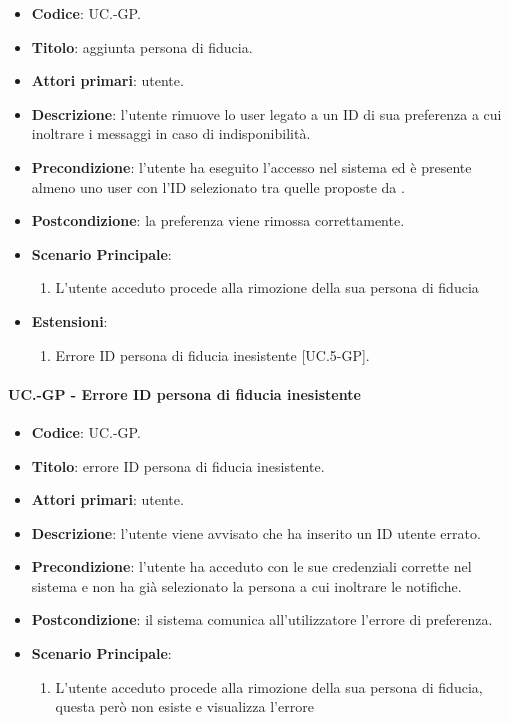 	\begin{itemize}
		\item \textbf{Codice}: UC\theuccount.\thesubuccount-GP.
		\item \textbf{Titolo}: aggiunta persona di fiducia.
		\item \textbf{Attori primari}: utente.
		\item \textbf{Descrizione}:  l’utente rimuove lo user legato a un ID di sua preferenza a cui inoltrare i messaggi in caso di indisponibilità.
		\item \textbf{Precondizione}: l’utente ha eseguito l'accesso nel sistema ed è presente almeno uno user con l'ID selezionato tra quelle proposte da \progetto.
		\item \textbf{Postcondizione}: la preferenza viene rimossa correttamente.
		\item \textbf{Scenario Principale}:
		\begin{enumerate}
			\item L'utente acceduto procede alla rimozione della sua persona di fiducia
		\end{enumerate}
		\item \textbf{Estensioni}:
		\begin{enumerate}
			\item Errore ID persona di fiducia inesistente [UC\theuccount.5-GP].
		\end{enumerate}
	\end{itemize}
	
	\paragraph{UC\theuccount.\thesubuccount-GP - Errore ID persona di fiducia inesistente}
	
	\begin{itemize}
		\item \textbf{Codice}: UC\theuccount.\thesubuccount-GP.
		\item \textbf{Titolo}: errore ID persona di fiducia inesistente.
		\item \textbf{Attori primari}: utente.
		\item \textbf{Descrizione}: l’utente viene avvisato che ha inserito un ID utente errato.
		\item \textbf{Precondizione}: l’utente ha acceduto con le sue credenziali corrette nel sistema e non ha già selezionato la persona a cui inoltrare le notifiche.
		\item \textbf{Postcondizione}: il sistema comunica all’utilizzatore l’errore di preferenza.
		\item \textbf{Scenario Principale}:
		\begin{enumerate}
			\item L'utente acceduto procede alla rimozione della sua persona di fiducia, questa però non esiste e
			visualizza l'errore
		\end{enumerate}
	\end{itemize}

